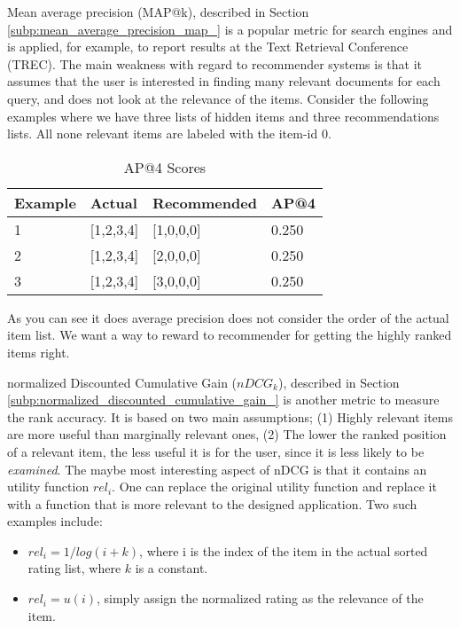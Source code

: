 

Mean average precision (MAP@k), described in Section \ref{subp:mean_average_precision_map_} is a popular metric for search engines and is applied, for example, to report results at the Text Retrieval Conference (TREC). The main weakness with regard to recommender systems is that it assumes that the user is interested in finding many relevant documents for each query, and does not look at the relevance of the items. Consider the following examples where we have three lists of hidden items and three recommendations lists. All none relevant items are labeled with the item-id $0$.

\begin{table}[H]
\label{table:ap}
\centering
\begin{tabular}{|l|l|l|l|}
\hline
Example 	& 	Actual	& 	Recommended		&	AP@4   \\ \hline
1			& [1,2,3,4]	&	[1,0,0,0]		&	0.250  \\ \hline
2			& [1,2,3,4]	&	[2,0,0,0]		&	0.250  \\ \hline
3			& [1,2,3,4]	&	[3,0,0,0]		&	0.250  \\
\hline
\end{tabular}
\caption{AP@4 Scores}
\end{table}

As you can see it does average precision does not consider the order of the actual item list. We want a way to
reward to recommender for getting the highly ranked items right.

normalized Discounted Cumulative Gain ($nDCG_{k}$), described in Section \ref{subp:normalized_discounted_cumulative_gain_}
is another metric to measure the rank accuracy. It is based on two main assumptions; (1) Highly relevant items are more useful than marginally relevant ones, (2) The lower the ranked position of a relevant item, the less useful it is for the user, since it is less likely to be \emph{examined}. The maybe most interesting aspect of nDCG is that it contains an utility function $rel_i$. One can replace the original utility function and replace it with a function that is more relevant to
the designed application. Two such examples include:

\begin{itemize}
\item $rel_i = 1/log(i+k)$, where i is the index of the item in the actual sorted rating list, where $k$ is a constant.
\item $rel_i = u(i)$, simply assign the normalized rating as the relevance of the item.
\end{itemize}

